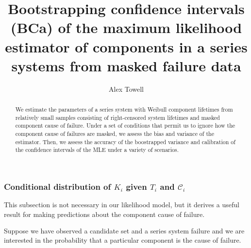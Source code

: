 \documentclass[
]{article}
\title{Bootstrapping confidence intervals (BCa) of the maximum
likelihood estimator of components in a series systems from masked
failure data}
\author{Alex Towell}
\date{}
\begin{document}
\maketitle
\begin{abstract}
We estimate the parameters of a series system with Weibull component
lifetimes from relatively small samples consisting of right-censored
system lifetimes and masked component cause of failure. Under a set of
conditions that permit us to ignore how the component cause of failures
are masked, we assess the bias and variance of the estimator. Then, we
assess the accuracy of the boostrapped variance and calibration of the
confidence intervals of the MLE under a variety of scenarios.
\end{abstract}

{
\setcounter{tocdepth}{2}
\tableofcontents
}
\newcommand{\T}{T}
\newtheorem{definition}{Definition}
\newtheorem{theorem}{Theorem}
\newtheorem{corollary}{Corollary}
\newtheorem{condition}{Condition}
\renewcommand{\v}[1]{\boldsymbol{#1}}

\hypertarget{conditional-distribution-of-k_i-given-t_i-and-mathcalc_i}{%
\subsubsection{\texorpdfstring{Conditional distribution of \(K_i\) given
\(T_i\) and
\(\mathcal{C}_i\)}{Conditional distribution of K\_i given T\_i and \textbackslash mathcal\{C\}\_i}}\label{conditional-distribution-of-k_i-given-t_i-and-mathcalc_i}}

This subsection is not necessary in our likelihood model, but it derives
a useful result for making predictions about the component cause of
failure.

Suppose we have observed a candidate set and a series system failure and
we are interested in the probability that a particular component is the
cause of failure.
\end{document}
